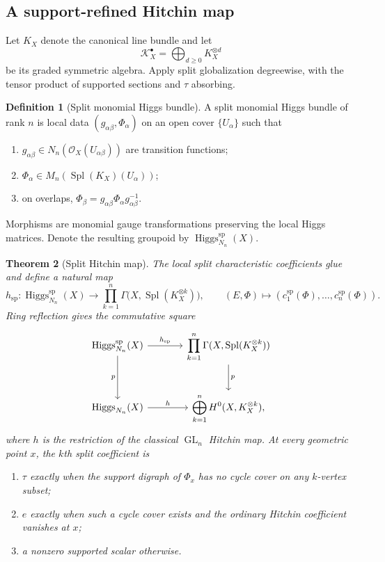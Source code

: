 \documentclass[11pt]{amsart}
\numberwithin{equation}{section}
\newtheorem{theorem}{Theorem}[section]
\theoremstyle{definition}
\newtheorem{definition}[theorem]{Definition}
\newcommand{\GL}{\operatorname{GL}}
\newcommand{\Spl}{\operatorname{Spl}}
\newcommand{\Higgs}{\operatorname{Higgs}}
\begin{document}
\subsection{A support-refined Hitchin map}

Let $K_X$ denote the canonical line bundle and let
\[
\mathscr K_X^\bullet=\bigoplus_{d\ge0}K_X^{\otimes d}
\]
be its graded symmetric algebra.  Apply split globalization degreewise,
with the tensor product of supported sections and $\tau$ absorbing.

\begin{definition}[Split monomial Higgs bundle]
A split monomial Higgs bundle of rank $n$ is local data
$(g_{\alpha\beta},\Phi_\alpha)$ on an open cover $\{U_\alpha\}$ such that
\begin{enumerate}[label=\textup{(\roman*)}]
\item $g_{\alpha\beta}\in N_n(\mathcal O_X(U_{\alpha\beta}))$ are
transition functions;
\item $\Phi_\alpha\in M_n(\Spl(K_X)(U_\alpha))$;
\item on overlaps,
$\Phi_\beta=g_{\alpha\beta}\Phi_\alpha g_{\alpha\beta}^{-1}$.
\end{enumerate}
Morphisms are monomial gauge transformations preserving the local Higgs
matrices.  Denote the resulting groupoid by
$\Higgs_{N_n}^{\mathrm{sp}}(X)$.
\end{definition}

\begin{theorem}[Split Hitchin map]
\label{thm:split-hitchin-map}
The local split characteristic coefficients glue and define a natural map
\[
h_{\mathrm{sp}}:
\Higgs_{N_n}^{\mathrm{sp}}(X)
\longrightarrow
\prod_{k=1}^n\Gamma\bigl(X,\Spl(K_X^{\otimes k})\bigr),
\qquad
(E,\Phi)\longmapsto(c_1^{\mathrm{sp}}(\Phi),\dots,c_n^{\mathrm{sp}}(\Phi)).
\]
Ring reflection gives the commutative square
\[
\begin{tikzcd}[column sep=large,row sep=large]
\Higgs_{N_n}^{\mathrm{sp}}(X)
  \arrow[r,"h_{\mathrm{sp}}"] \arrow[d,"p"']
& \displaystyle\prod_{k=1}^n\Gamma(X,\Spl(K_X^{\otimes k}))
  \arrow[d,"p"] \\
\Higgs_{N_n}(X)
  \arrow[r,"h"]
& \displaystyle\bigoplus_{k=1}^nH^0(X,K_X^{\otimes k}),
\end{tikzcd}
\]
where $h$ is the restriction of the classical $\GL_n$ Hitchin map.
At every geometric point $x$, the $k$th split coefficient is
\begin{enumerate}[label=\textup{(\alph*)}]
\item $\tau$ exactly when the support digraph of $\Phi_x$ has no cycle
cover on any $k$-vertex subset;
\item $e$ exactly when such a cycle cover exists and the ordinary Hitchin
coefficient vanishes at $x$;
\item a nonzero supported scalar otherwise.
\end{enumerate}
\end{theorem}
\end{document}
